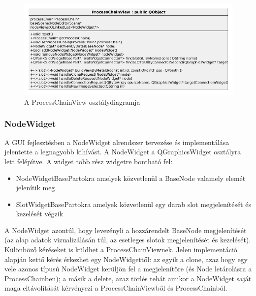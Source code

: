 \documentclass[a4paper,12pt,oneside]{report}
\begin{document}
\begin{center}
\begin{figure}[h]
  \includegraphics[width=1\textwidth]{processcahinview.png}
  \caption{A ProcessChainView osztálydiagramja}

  \label{fig:bimg_processchainview}
\end{figure}
\end{center}

\subsubsection{NodeWidget}
A GUI fejlesztésben a NodeWidget alrendszer tervezése és implementálása jelentette a legnagyobb kihívást. A NodeWidget a QGraphicsWidget osztályra lett felépítve. A widget több rész widgetre bontható fel:
\begin{itemize}
	\itemsep0em
	\item NodeWidgetBasePartokra amelyek közvetlenül a BaseNode valamely elemét jelenítik meg
	\item SlotWidgetBasePartokra amelyek közvetlenül egy darab slot megjelenítését és kezelését végzik
\end{itemize}
A NodeWidget azontúl, hogy levezényli a hozzárendelt BaseNode megjelenítését (az alap adatok vizualizálásán túl, az esetleges slotok megjelenítését és kezelését). Különböző kéréseket is küldhet a ProcessChainViewnek. Jelen implementáció alapján kettő kérés érkezhet egy NodeWidgettől: az egyik a clone, azaz hogy egy vele azonos típusú NodeWidget kerüljön fel a megjelenítőre (és Node letárolásra a ProcessChainben); a másik a delete, azaz törlés tehát amikor a NodeWidget saját maga eltávolítását kérvényezi a ProcessChainViewből és ProcessChainból.
\end{document}
